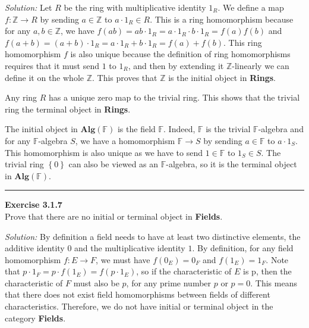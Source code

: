 \documentclass[a4paper, 11pt]{article}
\newenvironment{problem}[2][Exercise]
    { \begin{mdframed}[backgroundcolor=gray!20] \textbf{#1 #2} \\}
    {  \end{mdframed}}
\newenvironment{solution}
    {\textit{Solution:}}
    {}
\begin{document}
\begin{solution}
Let \(R\) be the ring with multiplicative identity \(1_R\). We define a map \(f:\mathbb{Z}\rightarrow R\) by sending \(a\in \mathbb{Z}\) to \(a\cdot 1_R\in R\). This is a ring homomorphism because 
for any \(a,b\in \mathbb{Z}\), we have \(f(ab)=ab\cdot 1_R=a\cdot 1_R\cdot b\cdot 1_R=f(a)f(b)\) and \(f(a+b)=(a+b)\cdot 1_R=a\cdot 1_R+b\cdot 1_R=f(a)+f(b)\). This ring homomorphism \(f\) is also 
unique because the definition of ring homomorphisms requires that it must send \(1\) to \(1_R\), and then by extending it \(\mathbb{Z}\)-linearly we can define it on the whole \(\mathbb{Z}\). This proves that 
\(\mathbb{Z}\) is the initial object in \textbf{Rings}.
\par 
Any ring \(R\) has a unique zero map to the trivial ring. This shows that the trivial ring the terminal object in \textbf{Rings}.
\par 
The initial object in \(\textbf{Alg}(\mathbb{F})\) is the field \(\mathbb{F}\). Indeed, \(\mathbb{F}\) is the trivial \(\mathbb{F}\)-algebra and for any 
\(\mathbb{F}\)-algebra \(S\), we have a homomorphism \(\mathbb{F}\rightarrow S\) by sending \(a\in \mathbb{F}\) to \(a\cdot 1_S\). This homomorphism is also unique as we have to send \(1\in \mathbb{F}\) to 
\(1_S\in S\). The trivial ring \(\left\{ 0 \right\}\) can also be viewed as an \(\mathbb{F}\)-algebra, so it is the terminal object in \(\textbf{Alg}(\mathbb{F})\).
\end{solution}
\\ 
\noindent\rule{7in}{2.8pt}
\begin{problem}{3.1.7}
Prove that there are no initial or terminal object in \textbf{Fields}.
\end{problem}
\begin{solution}
By definition a field needs to have at least two distinctive elements, the additive identity \(0\) and the multiplicative identity \(1\). By definition, for any 
field homomorphism \(f:E\rightarrow F\), we must have \(f(0_E)=0_F\) and \(f(1_E)=1_F\). Note that \(p\cdot 1_F=p\cdot f(1_E)=f(p\cdot 1_E)\), so if the characteristic of \(E\) is p, 
then the characteristic of \(F\) must also be \(p\), for any prime number \(p\) or \(p=0\). This means that there does not exist field homomorphisms between fields of different 
characteristics. Therefore, we do not have initial or terminal object in the category \textbf{Fields}.   
\end{solution}
\end{document}
